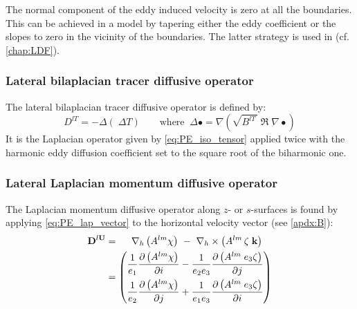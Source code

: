 \documentclass[../main/NEMO_manual]{subfiles}
\begin{document}
The normal component of the eddy induced velocity is zero at all the boundaries.
This can be achieved in a model by tapering either the eddy coefficient or
the slopes to zero in the vicinity of the boundaries.
The latter strategy is used in \NEMO (cf. \autoref{chap:LDF}).

\subsubsection{Lateral bilaplacian tracer diffusive operator}

The lateral bilaplacian tracer diffusive operator is defined by:
\[
  D^{lT}= - \Delta \left( \;\Delta T \right)
  \qquad \text{where} \;\; \Delta \bullet = \nabla \left( {\sqrt{B^{lT}\,}\;\Re \;\nabla \bullet} \right)
\]
It is the Laplacian operator given by \autoref{eq:PE_iso_tensor} applied twice with
the harmonic eddy diffusion coefficient set to the square root of the biharmonic one. 


\subsubsection{Lateral Laplacian momentum diffusive operator}

The Laplacian momentum diffusive operator along $z$- or $s$-surfaces is found by
applying \autoref{eq:PE_lap_vector} to the horizontal velocity vector (see \autoref{apdx:B}):
\[
  \begin{split}
    {\rm {\bf D}}^{l{\rm {\bf U}}}
    &= \quad \  \nabla _h \left( {A^{lm}\chi } \right)
    \ - \ \nabla _h \times \left( {A^{lm}\,\zeta \;{\rm {\bf k}}} \right)     \\
    &=   \left(
      \begin{aligned}
        \frac{1}{e_1      } \frac{\partial \left( A^{lm} \chi          \right)}{\partial i}
        &-\frac{1}{e_2 e_3}\frac{\partial \left( {A^{lm} \;e_3 \zeta} \right)}{\partial j}  \\
        \frac{1}{e_2      }\frac{\partial \left( {A^{lm} \chi         } \right)}{\partial j}
        &+\frac{1}{e_1 e_3}\frac{\partial \left( {A^{lm} \;e_3 \zeta} \right)}{\partial i}
      \end{aligned}
    \right)
  \end{split}
\]
\end{document}
